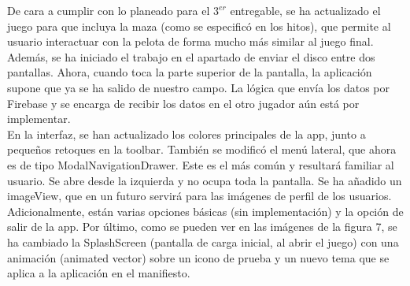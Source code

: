 \documentclass[a4paper,openright,12pt]{article}
\begin{document}
De cara a cumplir con lo planeado para el {$3^{er}$} entregable, se ha actualizado el juego para que incluya la maza (como se especificó en los hitos), que permite al usuario interactuar con la pelota de forma mucho más similar al juego final. Además, se ha iniciado el trabajo en el apartado de enviar el disco entre dos pantallas. Ahora, cuando toca la parte superior de la pantalla, la aplicación supone que ya se ha salido de nuestro campo. La lógica que envía los datos por Firebase y se encarga de recibir los datos en el otro jugador aún está por implementar.\\
En la interfaz, se han actualizado los colores principales de la app, junto a pequeños retoques en la toolbar. También se modificó el menú lateral, que ahora es de tipo ModalNavigationDrawer. Este es el más común y resultará familiar al usuario. Se abre desde la izquierda y no ocupa toda la pantalla. Se ha añadido un imageView, que en un futuro servirá para las imágenes de perfil de los usuarios. Adicionalmente, están varias opciones básicas (sin implementación) y la opción de salir de la app. Por último, como se pueden ver en las imágenes de la figura 7, se ha cambiado la SplashScreen (pantalla de carga inicial, al abrir el juego) con una animación (animated vector) sobre un icono de prueba y un nuevo tema que se aplica a la aplicación en el manifiesto.
\end{document}
